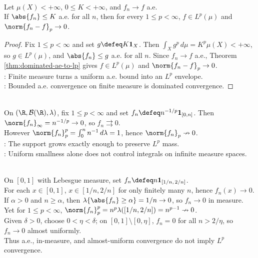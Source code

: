 \begin{corollary} \label{cor:bounded-ae-finite-measure-lp} \\
Let $\mu(X)<+\infty$, $0\leq K<+\infty$, and $f_n\to f$ a.e.\\
If $\abs{f_n}\leq K$ a.e. for all $n$, then for every $1\leq p<\infty$, $f\in L^p(\mu)$ and $\norm{f_n-f}_p\to0$.
\begin{proof}
Fix $1\leq p<\infty$ and set $g\defeq K\mathbf{1}_X$. Then $\int_Xg^p\,d\mu=K^p\mu(X)<+\infty$, so $g\in L^p(\mu)$, and $\abs{f_n}\leq g$ a.e. for all $n$. Since $f_n\to f$ a.e., Theorem \ref{thm:dominated-ae-to-lp} gives $f\in L^p(\mu)$ and $\norm{f_n-f}_p\to0$.\\
: Finite measure turns a uniform a.e. bound into an $L^p$ envelope.\\
: Bounded a.e. convergence on finite measure is dominated convergence.
\end{proof}
\end{corollary}

\begin{example} \label{ex:modes-uniform-not-lp-infinite-measure} \\
On $(\R,\mathcal{B}(\R),\lambda)$, fix $1\leq p<\infty$ and set $f_n\defeq n^{-1/p}\mathbf{1}_{[0,n]}$. Then $\norm{f_n}_\infty=n^{-1/p}\to0$, so $f_n\rightrightarrows0$.\\
However $\norm{f_n}_p^p=\int_0^n n^{-1}\,d\lambda=1$, hence $\norm{f_n}_p\nrightarrow0$.\\
: The support grows exactly enough to preserve $L^p$ mass.\\
: Uniform smallness alone does not control integrals on infinite measure spaces.
\end{example}

\begin{example} \label{ex:modes-ae-measure-not-lp-finite-measure} \\
On $[0,1]$ with Lebesgue measure, set $f_n\defeq n\mathbf{1}_{[1/n,\,2/n]}$.\\
For each $x\in[0,1]$, $x\in[1/n,2/n]$ for only finitely many $n$, hence $f_n(x)\to0$.\\
If $\alpha>0$ and $n\geq\alpha$, then $\lambda\{\abs{f_n}\geq\alpha\}=1/n\to0$, so $f_n\to0$ in measure.\\
Yet for $1\leq p<\infty$, $\norm{f_n}_p^p=n^p\lambda([1/n,2/n])=n^{p-1}\nrightarrow0$.\\
Given $\delta>0$, choose $0<\eta<\delta$; on $[0,1]\setminus[0,\eta]$, $f_n=0$ for all $n>2/\eta$, so $f_n\to0$ almost uniformly.\\
Thus a.e., in-measure, and almost-uniform convergence do not imply $L^p$ convergence.
\end{example}

